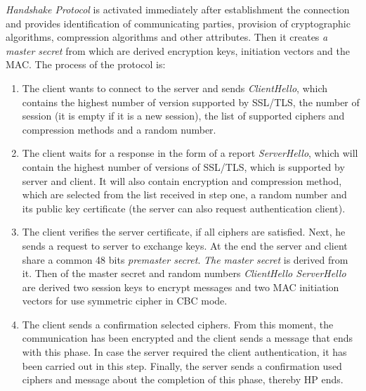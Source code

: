 \documentclass[
  digital, %
  notable,   %
  lof,     %
  lot,     %
]{fithesis3}
\begin{document}
\textit{Handshake Protocol} is activated immediately after establishment the connection and 
provides identification of communicating parties, provision of cryptographic algorithms, 
compression algorithms and other attributes. Then it creates \textit{a master secret} from 
which are derived encryption keys, initiation vectors and the MAC. The process of the protocol 
is:
\vskip0.1in
\begin{enumerate}
\item The client wants to connect to the server and sends \textit{ClientHello}, which contains 
the highest number of version supported by SSL/TLS, the number of session (it is empty if it 
is a new session), the list of supported ciphers and compression methods and a random number.
\item The client waits for a response in the form of a report \textit{ServerHello}, which will 
contain the highest number of versions of SSL/TLS, which is supported by server and client. It 
will also contain encryption and compression method, which are selected from the list received 
in step one, a random number and its public key certificate (the server can also request 
authentication client).
\item The client verifies the server certificate, if all ciphers are satisfied. Next, he sends 
a request to server to exchange keys. At the end the server and client share a common 48 bits 
\textit{premaster secret}. \textit{The master secret} is derived from it. Then of the master 
secret and random numbers \textit{ClientHello ServerHello} are derived two session keys to 
encrypt messages and two MAC initiation vectors for use symmetric cipher in CBC mode. 
\item The client sends a confirmation selected ciphers. From this moment, the communication 
has been encrypted and the client sends a message that ends with this phase. In case the 
server required the client authentication, it has been carried out in this step. Finally, the 
server sends a confirmation used ciphers and message about the completion of this phase, 
thereby HP ends.
\end{enumerate}


 
\end{document}
